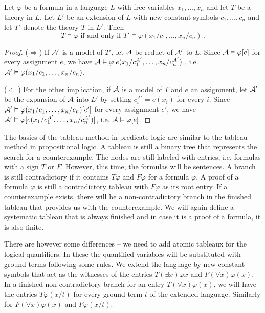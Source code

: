\begin{theorem}
Let $\varphi$ be a formula in a language $L$ with free variables $x_1, \dots, x_n$ and let $T$ be a theory in $L$. Let $L'$ be an extension of $L$ with new constant symbols $c_1, \dots, c_n$ and let $T'$ denote the theory $T$ in $L'$. Then $$T \vDash \varphi \text{ if and only if } T'\vDash \varphi(x_1/c_1, \dots, x_n/c_n)\,.$$
\end{theorem}
\begin{proof}
($\Rightarrow$) If $\mathcal{A}'$ is a model of $T'$, let $\mathcal{A}$ be reduct of $\mathcal{A}'$ to $L$. Since $\mathcal{A} \vDash \varphi[e]$ for every assignment $e$, we have $\mathcal{A} \vDash \varphi[e(x_1/c_1^{A'}, \dots, x_n/c_n^{A'})]$, i.e. $\mathcal{A}' \vDash \varphi(x_1/c_1, \dots, x_n/c_n)$.

($\Leftarrow$) For the other implication, if $\mathcal{A}$ is a model of $T$ and $e$ an assignment, let $\mathcal{A}'$ be the expansion of $\mathcal{A}$ into $L'$ by setting $c_i^{A'} = e(x_i)$ for every $i$. Since $\mathcal{A}' \vDash \varphi(x_1/c_1, \dots, x_n/c_n)[e']$ for every assignment $e'$, we have $\mathcal{A}' \vDash \varphi[e(x_1/c_1^{A'}, \dots, x_n/c_n^{A'})]$, i.e. $\mathcal{A} \vDash \varphi[e]$.
\end{proof}

The basics of the tableau method in predicate logic are similar to the tableau method in propositional logic. A tableau is still a binary tree that represents the search for a counterexample. The nodes are still labeled with entries, i.e. formulas with a sign $T$ or $F$. However, this time, the formulas will be sentences. A branch is still contradictory if it contains $T \varphi$ and $F \varphi$ for a formula $\varphi$. A proof of a formula $\varphi$ is still a contradictory tableau with $F \varphi$ as its root entry. If a counterexample exists, there will be a non-contradictory branch in the finished tableau that provides us with the counterexample. We will again define a systematic tableau that is always finished and in case it is a proof of a formula, it is also finite. 

There are however some differences -- we need to add atomic tableaux for the logical quantifiers. In these the quantified variables will be substituted with ground terms following some rules. We extend the language by new constant symbols that act as the witnesses of the entries $T(\exists x) \varphi x$ and $F(\forall x) \varphi(x)$. In a finished non-contradictory branch for an entry $T (\forall x) \varphi(x)$, we will have the entries $T \varphi(x/t)$ for every ground term $t$ of the extended language. Similarly for $F (\forall x) \varphi(x)$ and $F \varphi(x/t)$.

